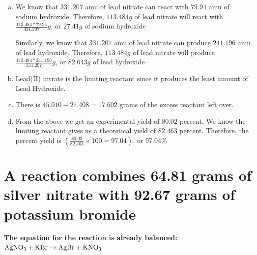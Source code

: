 \documentclass{scrartcl}
\begin{document}
\begin{enumerate}[a.]
\item We know that \(331.207\) amu of  lead nitrate can react with \(79.94\) amu of sodium
hydroxide. Therefore, \(113.484g\) of lead nitrate will react with
\(\frac{113.484*79.94}{331.207}g\), or \(27.41g\) of sodium hydroxide

Similarly, we know that \(331.207\) amu of  lead nitrate can produce \(241.196\) amu of lead
hydroxide. Therefore, \(113.484g\) of lead nitrate will produce
\(\frac{113.484*241.196}{331.207}g\), or \(82.643g\) of lead hydroxide
\item Lead(II) nitrate is the limiting reactant since it produces the least amount
of Lead Hydroxide.
\item There is \(45.010-27.408=17.602\) grams of the excess reactant left over.
\item From the above we get an experimental yield of \(80.02\) percent. We know the
limiting reactant gives us a theoretical yield of \(82.463\) percent.
Therefore, the percent yield is    \((\frac{80.02}{82.463}\times100=97.04)\), or 97.04\%
\end{enumerate}

\section{A reaction combines 64.81 grams of silver nitrate with 92.67 grams of potassium bromide}
\label{sec:orgd5cddc5}
\textbf{The equation for the reaction is already balanced:}
\(\ce{AgNO3}+\ce{KBr}\rightarrow\ce{AgBr}+\ce{KNO3}\)
\end{document}
